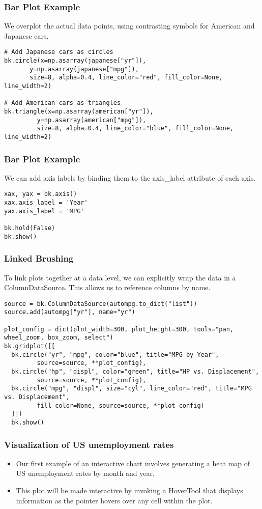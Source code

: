 \begin{frame}[fragile] \frametitle{Bar Plot Example}
We overplot the actual data points, using contrasting symbols for American and Japanese cars.
\begin{lstlisting}
# Add Japanese cars as circles
bk.circle(x=np.asarray(japanese["yr"]), 
       y=np.asarray(japanese["mpg"]), 
       size=8, alpha=0.4, line_color="red", fill_color=None, line_width=2)

# Add American cars as triangles
bk.triangle(x=np.asarray(american["yr"]), 
         y=np.asarray(american["mpg"]),
         size=8, alpha=0.4, line_color="blue", fill_color=None, line_width=2)
\end{lstlisting}
\end{frame}

\begin{frame}[fragile] \frametitle{Bar Plot Example}
We can add axis labels by binding them to the axis\_label attribute of each axis.
\begin{lstlisting}
xax, yax = bk.axis()
xax.axis_label = 'Year'
yax.axis_label = 'MPG'

bk.hold(False)
bk.show()
\end{lstlisting}
\end{frame}

\begin{frame}[fragile] \frametitle{Linked Brushing}
To link plots together at a data level, we can explicitly wrap the data in a ColumnDataSource. This allows us to reference columns by name.
\begin{lstlisting}
source = bk.ColumnDataSource(autompg.to_dict("list"))
source.add(autompg["yr"], name="yr")

plot_config = dict(plot_width=300, plot_height=300, tools="pan, wheel_zoom, box_zoom, select")
bk.gridplot([[
  bk.circle("yr", "mpg", color="blue", title="MPG by Year",
         source=source, **plot_config),
  bk.circle("hp", "displ", color="green", title="HP vs. Displacement",
         source=source, **plot_config),
  bk.circle("mpg", "displ", size="cyl", line_color="red", title="MPG vs. Displacement",
         fill_color=None, source=source, **plot_config)
  ]])
  bk.show()
\end{lstlisting}
\end{frame}


\begin{frame}[fragile] \frametitle{Visualization of US unemployment rates}
\begin{itemize}
\item Our first example of an interactive chart involves generating a heat map of US unemployment rates by month and year.
\item This plot will be made interactive by invoking a HoverTool that displays information as the pointer hovers over any cell within the plot.
\end{itemize}

\end{frame}


